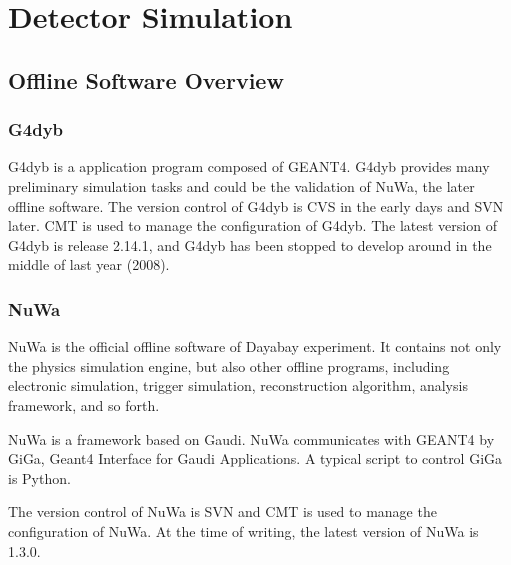 \chapter {Detector Simulation}

\section {Offline Software Overview}

\subsection {G4dyb}

G4dyb is a application program composed of GEANT4.
G4dyb provides many preliminary simulation tasks and could be
the validation of NuWa, the later offline software.
The version control of G4dyb is CVS in the early days and
SVN later. CMT is used to manage the configuration of G4dyb.
The latest version of G4dyb is release 2.14.1, and
G4dyb has been stopped to develop around in the middle of last year (2008).


\subsection {NuWa}

NuWa is the official offline software of Dayabay experiment.
It contains not only the physics simulation engine, but also
other offline programs, including electronic simulation,
trigger simulation, reconstruction algorithm, analysis framework, and so forth.

NuWa is a framework based on Gaudi.
NuWa communicates with GEANT4 by GiGa, Geant4 Interface for Gaudi Applications.
A typical script to control GiGa is Python.


The version control of NuWa is SVN and CMT is used to manage
the configuration of NuWa.
At the time of writing, the latest version of NuWa is 1.3.0.



